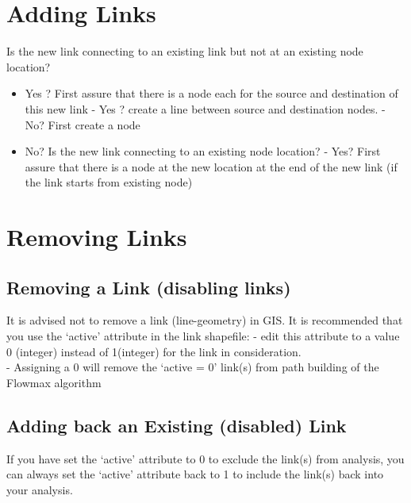 \documentclass[
]{book}
\providecommand{\tightlist}{%
  \setlength{\itemsep}{0pt}\setlength{\parskip}{0pt}}
\begin{document}
\hypertarget{adding-links}{%
\chapter{Adding Links}\label{adding-links}}

Is the new link connecting to an existing link but not at an existing node location?

\begin{itemize}
\tightlist
\item
  Yes ? First assure that there is a node each for the source and destination of this new link
  - Yes ? create a line between source and destination nodes.
  - No? First create a node
\item
  No? Is the new link connecting to an existing node location?
  - Yes? First assure that there is a node at the new location at the end of the new link (if the link starts from existing node)
\end{itemize}

\hypertarget{removing-links}{%
\chapter{Removing Links}\label{removing-links}}

\hypertarget{removing-a-link-disabling-links}{%
\section{Removing a Link (disabling links)}\label{removing-a-link-disabling-links}}

It is advised not to remove a link (line-geometry) in GIS.
It is recommended that you use the `active' attribute in the link shapefile:
- edit this attribute to a value 0 (integer) instead of 1(integer) for the link in consideration.\\
- Assigning a 0 will remove the `active = 0' link(s) from path building of the Flowmax algorithm

\hypertarget{adding-back-an-existing-disabled-link}{%
\section{Adding back an Existing (disabled) Link}\label{adding-back-an-existing-disabled-link}}

If you have set the `active' attribute to 0 to exclude the link(s) from analysis, you can always set the `active' attribute back to 1 to include the link(s) back into your analysis.
\end{document}
